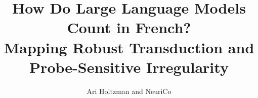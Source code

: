 \documentclass{article}
\title{How Do Large Language Models Count in French?\\
Mapping Robust Transduction and Probe-Sensitive Irregularity}
\author{Ari Holtzman and NeuriCo}
\begin{document}
\maketitle

\begin{abstract}

\end{abstract}









\end{document}
